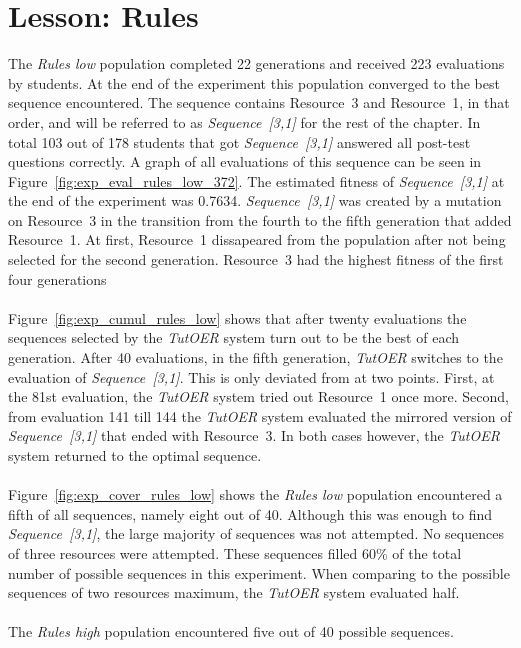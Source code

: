 \section{Lesson: Rules}
\label{sec:results_rules}
The \emph{Rules low} population completed 22 generations and received 
223 evaluations by students. At the end of the experiment
this population converged to the best sequence encountered. The
sequence contains Resource~3 and Resource~1, in that order, and will be
referred to as \emph{Sequence~[3,1]} for the rest of the chapter. In total 103
out of 178 students that got \emph{Sequence~[3,1]} answered all post-test
questions correctly. A graph of all evaluations of this sequence can be seen in
Figure~\ref{fig:exp_eval_rules_low_372}.
The estimated fitness of \emph{Sequence~[3,1]} at the end of the experiment was
0.7634. \emph{Sequence~[3,1]} was created by a mutation on Resource~3 in the transition
from the fourth to the fifth generation that added Resource~1. At first,
Resource~1 dissapeared from the population after not being selected for the
second generation. Resource~3 had the highest fitness of the first four
generations \\\\
\noindent
Figure~\ref{fig:exp_cumul_rules_low} shows that after twenty evaluations the
sequences selected by the \emph{TutOER} system turn out to be the best of each
generation. After 40 evaluations, in the fifth generation, \emph{TutOER}
switches to the evaluation of \emph{Sequence~[3,1]}. This is only deviated from at
two points. First, at the 81st evaluation, the \emph{TutOER} system tried out
Resource~1 once more. Second, from evaluation 141 till 144 the \emph{TutOER}
system evaluated the mirrored version of \emph{Sequence~[3,1]} that ended with
Resource~3. In both cases however, the \emph{TutOER} system returned to the
optimal sequence.\\\\
\noindent
Figure~\ref{fig:exp_cover_rules_low} shows the \emph{Rules low} population
encountered a fifth of all sequences, namely eight out of 40. Although this was
enough to find \emph{Sequence~[3,1]}, the large majority of sequences was not
attempted. No sequences of three resources were attempted. These sequences
filled 60\% of the total number of possible sequences in this experiment. When
comparing to the possible sequences of two resources maximum, the \emph{TutOER}
system evaluated half.\\\\
\noindent
The \emph{Rules high} population encountered five out of 40 possible sequences.
